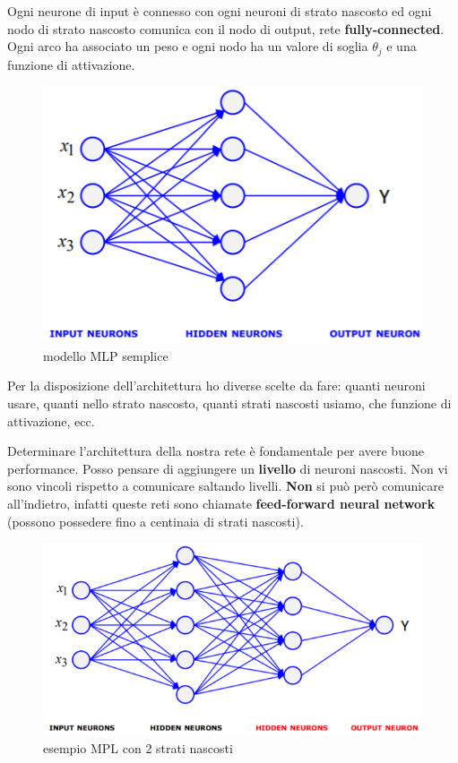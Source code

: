Ogni neurone di input \`e connesso con ogni neuroni di strato nascosto  ed ogni nodo di strato nascosto comunica con il nodo di output, rete \textbf{fully-connected}. Ogni arco ha associato un peso e ogni nodo ha un valore di soglia $\theta_j$ e una funzione di attivazione. 

\begin{figure}[H]
	\centering
	\includegraphics[height=0.5 \linewidth]{classification/pict/mlp_struct.png}
	\caption{modello MLP semplice}
\end{figure}

Per la disposizione dell'architettura ho diverse scelte da fare: quanti neuroni usare, quanti nello strato nascosto, quanti strati nascosti usiamo, che funzione di attivazione, ecc.

Determinare l'architettura della nostra rete è fondamentale per avere buone performance. Posso pensare di aggiungere un \textbf{livello} di neuroni nascosti. Non vi sono vincoli rispetto a comunicare saltando livelli. \textbf{Non} si pu\`o per\`o comunicare all'indietro, infatti queste reti sono chiamate \textbf{feed-forward neural network} (possono possedere fino a centinaia di strati nascosti).

\begin{figure}[H]
	\centering
	\includegraphics[height=0.5 \linewidth]{classification/pict/mlp_esempio.png}
	\caption{esempio MPL con 2 strati nascosti}
\end{figure}

